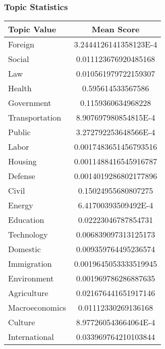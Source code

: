 \documentclass{article}
\begin{document}
\subsubsection*{Topic Statistics}
\begin{tabular}{|l|c|}
\hline
\textbf{Topic Value} & \textbf{Mean Score} \\
\hline
Foreign & 3.2444126141358123E-4 \\
\hline
Social & 0.011123676920485168 \\
\hline
Law & 0.010561979722159307 \\
\hline
Health & 0.595614533567586 \\
\hline
Government & 0.1159360634968228 \\
\hline
Transportation & 8.907697980854815E-4 \\
\hline
Public & 3.272792253648566E-4 \\
\hline
Labor & 0.0017483651456793516 \\
\hline
Housing & 0.0011488416545916787 \\
\hline
Defense & 0.0014019286802177896 \\
\hline
Civil & 0.15024955680807275 \\
\hline
Energy & 6.41700393509492E-4 \\
\hline
Education & 0.02223046787854731 \\
\hline
Technology & 0.006839097313125173 \\
\hline
Domestic & 0.009359764495236574 \\
\hline
Immigration & 0.0019645053333519945 \\
\hline
Environment & 0.001969786286887635 \\
\hline
Agriculture & 0.021676441651917146 \\
\hline
Macroeconomics & 0.01112330269136168 \\
\hline
Culture & 8.977260543664064E-4 \\
\hline
International & 0.033969764210103844 \\
\hline
\end{tabular}
\end{document}
